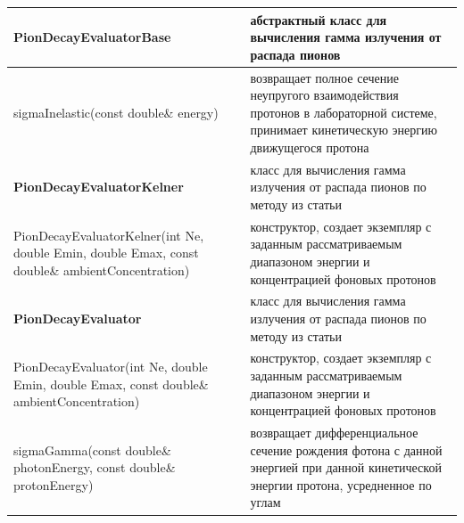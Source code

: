 		\begin{small}
			\label{pionDecay}
			\begin{xtabular}{|p{0.5\textwidth}|p{0.5\textwidth}|}  
				\hline
				\textbf{PionDecayEvaluatorBase} & абстрактный класс для вычисления гамма излучения от распада пионов\\
				\hline
				sigmaInelastic(const double\& energy) & возвращает полное сечение неупругого взаимодействия протонов в лабораторной системе, принимает кинетическую энергию движущегося протона\\
				\hline
				\textbf{PionDecayEvaluatorKelner} & класс для вычисления гамма излучения от распада пионов по методу из статьи \cite{Kelner}\\
				\hline
				PionDecayEvaluatorKelner(int Ne, double Emin, double Emax, const double\& ambientConcentration) & конструктор, создает экземпляр с заданным рассматриваемым диапазоном энергии и концентрацией фоновых протонов\\
				\hline
				\textbf{PionDecayEvaluator} & класс для вычисления гамма излучения от распада пионов по методу из статьи \cite{Kafexhiu}\\
				\hline
				PionDecayEvaluator(int Ne, double Emin, double Emax, const double\& ambientConcentration) & конструктор, создает экземпляр с заданным рассматриваемым диапазоном энергии и концентрацией фоновых протонов\\
				\hline
				sigmaGamma(const double\& photonEnergy, const double\& protonEnergy) & возвращает дифференциальное сечение рождения фотона с данной энергией при данной кинетической энергии протона, усредненное по углам\\
				\hline
			\end{xtabular}
		\end{small}

